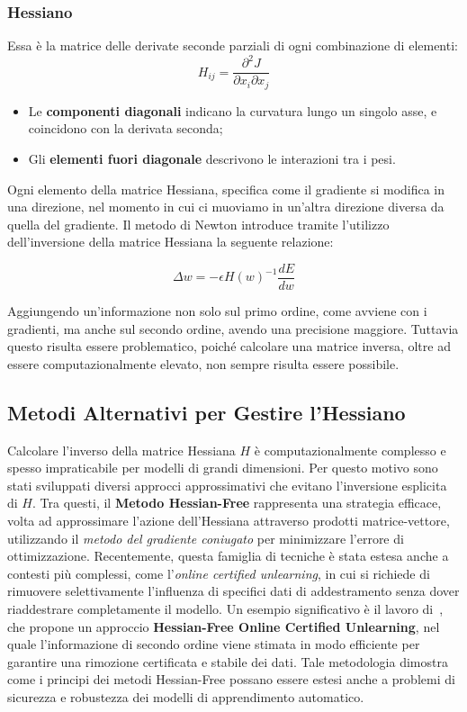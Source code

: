 \subsubsection{Hessiano}
Essa è la matrice delle derivate seconde parziali di ogni combinazione di elementi:
\begin{equation}
H_{ij} = \frac{\partial^2 J}{\partial x_i \partial x_j}
\end{equation}
\begin{itemize}
    \item Le \textbf{componenti diagonali} indicano la curvatura lungo un singolo asse, e coincidono con la derivata seconda;
    \item Gli \textbf{elementi fuori diagonale} descrivono le interazioni tra i pesi.
\end{itemize}
Ogni elemento della matrice Hessiana, specifica come il gradiente si modifica in una direzione, nel momento in cui ci muoviamo in un'altra direzione diversa da quella del gradiente. Il metodo di Newton introduce tramite l'utilizzo dell'inversione della matrice Hessiana la seguente relazione:

\begin{equation}
    \Delta w = -\epsilon H(w)^{-1}\frac{d E}{d w}
\end{equation}

Aggiungendo un'informazione non solo sul primo ordine, come avviene con i gradienti, ma anche sul secondo ordine, avendo una precisione maggiore. Tuttavia questo risulta essere problematico, poiché calcolare una matrice inversa, oltre ad essere computazionalmente elevato, non sempre risulta essere possibile.


\subsection{Metodi Alternativi per Gestire l'Hessiano}

Calcolare l'inverso della matrice Hessiana \( H \) è computazionalmente complesso e spesso impraticabile per modelli di grandi dimensioni. Per questo motivo sono stati sviluppati diversi approcci approssimativi che evitano l'inversione esplicita di \( H \). Tra questi, il \textbf{Metodo Hessian-Free} rappresenta una strategia efficace, volta ad approssimare l'azione dell'Hessiana attraverso prodotti matrice-vettore, utilizzando il \textit{metodo del gradiente coniugato} per minimizzare l'errore di ottimizzazione. Recentemente, questa famiglia di tecniche è stata estesa anche a contesti più complessi, come l'\textit{online certified unlearning}, in cui si richiede di rimuovere selettivamente l’influenza di specifici dati di addestramento senza dover riaddestrare completamente il modello. Un esempio significativo è il lavoro di~\textcite{Qiao2023HessianFreeUnlearning}, che propone un approccio \textbf{Hessian-Free Online Certified Unlearning}, nel quale l’informazione di secondo ordine viene stimata in modo efficiente per garantire una rimozione certificata e stabile dei dati. Tale metodologia dimostra come i principi dei metodi Hessian-Free possano essere estesi anche a problemi di sicurezza e robustezza dei modelli di apprendimento automatico.

